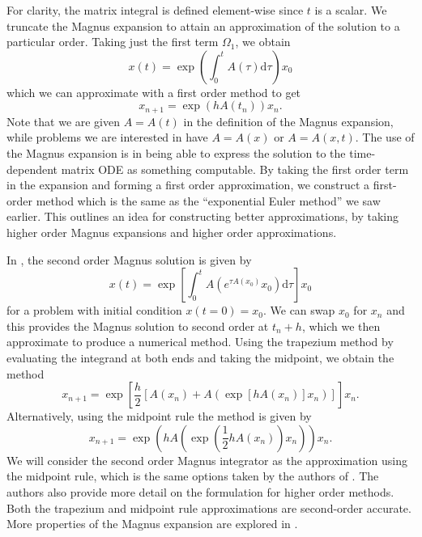 For clarity, the matrix integral is defined element-wise since $t$ is a scalar.
We truncate the Magnus expansion to attain an approximation of the solution to a particular order.
Taking just the first term $\Omega_1$, we obtain
\begin{equation*}
    x(t) = \exp\left( \int_{0}^{t} A(\tau) \mathrm{d}\tau \right)x_0
\end{equation*}
which we can approximate with a first order method to get
\begin{equation*}
    x_{n+1} = \exp\left( h A(t_n) \right)x_n.
\end{equation*}
Note that we are given $A = A(t)$ in the definition of the Magnus expansion,
while problems we are interested in have $A=A(x)$ or $A=A(x,t)$.
The use of the Magnus expansion is in being able to express the solution to the time-dependent matrix ODE as something computable.
By taking the first order term in the expansion and forming a first order approximation, we construct a first-order method which is the same as the ``exponential Euler method''  we saw earlier.
This outlines an idea for constructing better approximations, by taking higher order Magnus expansions and higher order approximations.

In \cite{blanes_pos_2022}, the second order Magnus solution is given by
\begin{equation*}
    x(t) = \exp \left[ \int_{0}^{t} A \left( e^{\tau A(x_0)} x_0 \right) \mathrm{d}\tau \right]x_0
\end{equation*}
for a problem with initial condition $x(t=0) = x_0$.
We can swap $x_0$ for $x_n$ and this provides the Magnus solution to second order at $t_n + h$,
which we then approximate to produce a numerical method.
Using the trapezium method by evaluating the integrand at both ends and taking the midpoint,
we obtain the method
\begin{equation*}
    x_{n+1} = \exp \left[ \frac{h}{2}\left[ A(x_n) + A\left(
        \exp \left[ h A(x_n) \right]x_n
    \right) \right] \right]x_n.
\end{equation*}
Alternatively, using the midpoint rule the method is given by
\begin{equation}
    x_{n+1} = \exp\left(h A \left( \exp\left(\frac{1}{2}h A(x_n)\right) x_n \right) \right) x_n.
    \label{eqn:secondordermagnus}
\end{equation}
We will consider the second order Magnus integrator as the approximation using the midpoint rule, which is the same options taken by the authors of \cite{blanes_pos_2022}.
The authors also provide more detail on the formulation for higher order methods.
Both the trapezium and midpoint rule approximations are second-order accurate.
More properties of the Magnus expansion are explored in \cite{blanesmagnus2009}.

